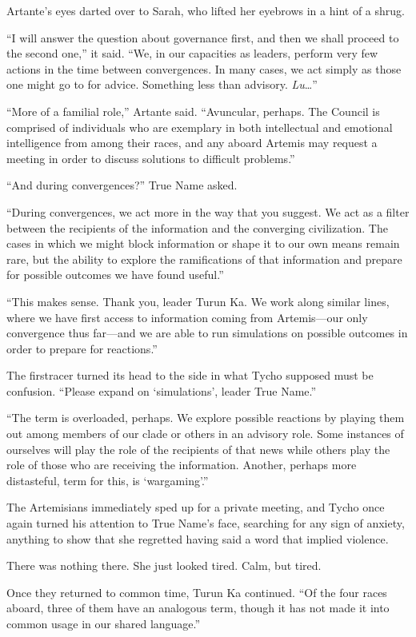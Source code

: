 Artante's eyes darted over to Sarah, who lifted her eyebrows in a hint of a shrug.

``I will answer the question about governance first, and then we shall proceed to the second one,'' it said. ``We, in our capacities as leaders, perform very few actions in the time between convergences. In many cases, we act simply as those one might go to for advice. Something less than advisory. \emph{Lu}\ldots{}''

``More of a familial role,'' Artante said. ``Avuncular, perhaps. The Council is comprised of individuals who are exemplary in both intellectual and emotional intelligence from among their races, and any aboard Artemis may request a meeting in order to discuss solutions to difficult problems.''

``And during convergences?'' True Name asked.

``During convergences, we act more in the way that you suggest. We act as a filter between the recipients of the information and the converging civilization. The cases in which we might block information or shape it to our own means remain rare, but the ability to explore the ramifications of that information and prepare for possible outcomes we have found useful.''

``This makes sense. Thank you, leader Turun Ka. We work along similar lines, where we have first access to information coming from Artemis—our only convergence thus far—and we are able to run simulations on possible outcomes in order to prepare for reactions.''

The firstracer turned its head to the side in what Tycho supposed must be confusion. ``Please expand on `simulations', leader True Name.''

``The term is overloaded, perhaps. We explore possible reactions by playing them out among members of our clade or others in an advisory role. Some instances of ourselves will play the role of the recipients of that news while others play the role of those who are receiving the information. Another, perhaps more distasteful, term for this, is `wargaming'.''

The Artemisians immediately sped up for a private meeting, and Tycho once again turned his attention to True Name's face, searching for any sign of anxiety, anything to show that she regretted having said a word that implied violence.

There was nothing there. She just looked tired. Calm, but tired.

Once they returned to common time, Turun Ka continued. ``Of the four races aboard, three of them have an analogous term, though it has not made it into common usage in our shared language.''

